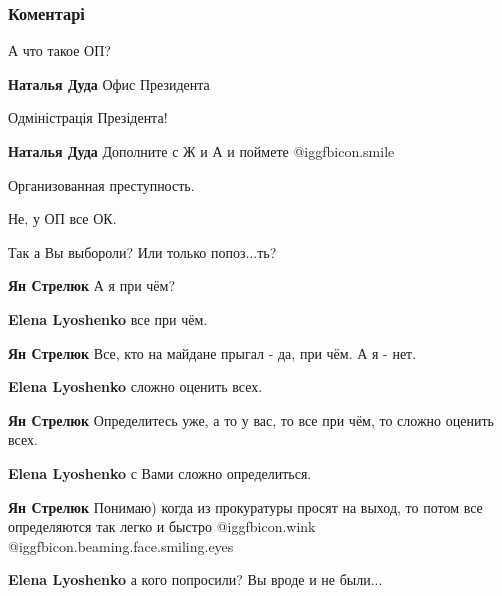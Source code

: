  
 
 
 
 
\subsubsection{Коментарі}

\begin{itemize} %
А что такое ОП?

\begin{itemize} %
\textbf{Наталья Дуда}
Офис Президента

Одміністрація Презідента!

\textbf{Наталья Дуда} Дополните с Ж и А и поймете  @igg{fbicon.smile} 

Организованная преступность.

Не, у ОП все ОК.
\end{itemize} %

Так а Вы выбороли? Или только попоз...ть?

\begin{itemize} %
\textbf{Ян Стрелюк}
А я при чём?

\textbf{Elena Lyoshenko} все при чём.


\textbf{Ян Стрелюк}
Все, кто на майдане прыгал - да, при чём. А я - нет.

\textbf{Elena Lyoshenko} сложно оценить всех.


\textbf{Ян Стрелюк}
Определитесь уже, а то у вас, то все при чём, то сложно оценить всех.

\textbf{Elena Lyoshenko} с Вами сложно определиться.


\textbf{Ян Стрелюк}
Понимаю) когда из прокуратуры просят на выход, то потом все определяются так легко и быстро  @igg{fbicon.wink}  @igg{fbicon.beaming.face.smiling.eyes} 

\textbf{Elena Lyoshenko} а кого попросили? Вы вроде и не были...


\end{itemize}
\end{itemize}
